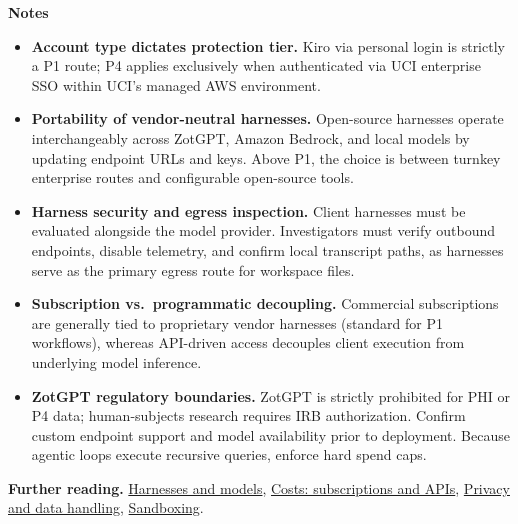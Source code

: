 \documentclass[10pt,letterpaper]{article}
\begin{document}
\smallskip
\textbf{Notes}
\begin{itemize}
\item \textbf{Account type dictates protection tier.} Kiro via personal login is strictly a P1 route; P4 applies exclusively when authenticated via UCI enterprise SSO within UCI's managed AWS environment.
\item \textbf{Portability of vendor-neutral harnesses.} Open-source harnesses operate interchangeably across ZotGPT, Amazon Bedrock, and local models by updating endpoint URLs and keys. Above P1, the choice is between turnkey enterprise routes and configurable open-source tools.
\item \textbf{Harness security and egress inspection.} Client harnesses must be evaluated alongside the model provider. Investigators must verify outbound endpoints, disable telemetry, and confirm local transcript paths, as harnesses serve as the primary egress route for workspace files.
\item \textbf{Subscription vs.\ programmatic decoupling.} Commercial subscriptions are generally tied to proprietary vendor harnesses (standard for P1 workflows), whereas API-driven access decouples client execution from underlying model inference.
\item \textbf{ZotGPT regulatory boundaries.} ZotGPT is strictly prohibited for PHI or P4 data; human-subjects research requires IRB authorization. Confirm custom endpoint support and model availability prior to deployment. Because agentic loops execute recursive queries, enforce hard spend caps.
\end{itemize}

\vspace{-1pt}
{\small\textbf{Further reading.}
\href{https://peterchang77.github.io/agent-ai-skills/concepts/harnesses/}{Harnesses and models},
\href{https://peterchang77.github.io/agent-ai-skills/concepts/costs/}{Costs: subscriptions and APIs},
\href{https://peterchang77.github.io/agent-ai-skills/concepts/privacy/}{Privacy and data handling},
\href{https://peterchang77.github.io/agent-ai-skills/concepts/sandboxing/}{Sandboxing}.}
\end{document}

